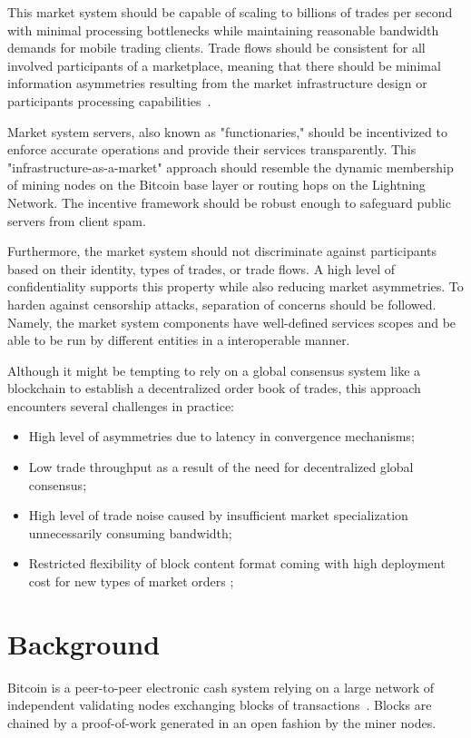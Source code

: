\documentclass[pdflatex,sn-mathphys]{sn-jnl}%
\theoremstyle{thmstyleone}%
\theoremstyle{thmstyletwo}%
\theoremstyle{thmstylethree}%
\begin{document}
This market system should be capable of scaling to billions of trades per second with minimal processing bottlenecks while maintaining reasonable bandwidth demands for mobile trading clients. Trade flows should be consistent for all involved participants of a marketplace, meaning that there should be minimal information asymmetries resulting from the market infrastructure design or participants processing capabilities~\cite{Lemons1970Akerlof}.

Market system servers, also known as "functionaries," should be incentivized to enforce accurate operations and provide their services transparently. This "infrastructure-as-a-market" approach should resemble the dynamic membership of mining nodes on the Bitcoin base layer or routing hops on the Lightning Network. The incentive framework should be robust enough to safeguard public servers from client spam.

Furthermore, the market system should not discriminate against participants based on their identity, types of trades, or trade flows. A high level of confidentiality supports this property while also reducing market asymmetries. To harden against censorship attacks, separation of concerns should be followed. Namely, the market system components have well-defined services scopes and be able to be run by different entities in a interoperable manner.

Although it might be tempting to rely on a global consensus system like a blockchain to establish a decentralized order book of trades, this approach encounters several challenges in practice:
\begin{itemize}
    \item High level of asymmetries due to latency in convergence mechanisms;
    \item Low trade throughput as a result of the need for decentralized global consensus;
    \item High level of trade noise caused by insufficient market specialization unnecessarily consuming bandwidth;
    \item Restricted flexibility of block content format coming with high deployment cost for new types of market orders ;
\end{itemize}

\section{Background}

Bitcoin is a peer-to-peer electronic cash system relying on a large network of independent validating nodes exchanging blocks of transactions~\cite{Bitcoin2008Satoshi}. Blocks are chained by a proof-of-work generated in an open fashion by the miner nodes.
\end{document}
